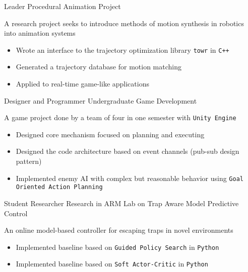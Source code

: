 \documentclass[10pt, a4paper, sans]{moderncv}
\begin{document}
{Leader}
{Procedural Animation Project}
{}{}
{
	A research project seeks to introduce methods of motion synthesis in robotics into animation systems
	\begin{itemize}
		\item Wrote an interface to the trajectory optimization library \texttt{towr} in \texttt{C++}
		\item Generated a trajectory database for motion matching
		\item Applied to real-time game-like applications
	\end{itemize}
}

{Designer and Programmer}
{Undergraduate Game Development}
{}{}
{A game project done by a team of four in one semester with \texttt{Unity Engine}
	\begin{itemize}
		\item Designed core mechanism focused on planning and executing
		\item Designed the code architecture based on event channels (pub-sub design pattern)
		\item Implemented enemy AI with complex but reasonable behavior using \texttt{Goal Oriented Action Planning}
	\end{itemize}
}

{Student Researcher}
{Research in ARM Lab on Trap Aware Model Predictive Control}
{}{}
{
	An online model-based controller for escaping traps in novel environments
	\begin{itemize}
		\item Implemented baseline based on \texttt{Guided Policy Search} in \texttt{Python}
		\item Implemented baseline based on \texttt{Soft Actor-Critic} in \texttt{Python}
	\end{itemize}
}

\end{document}
